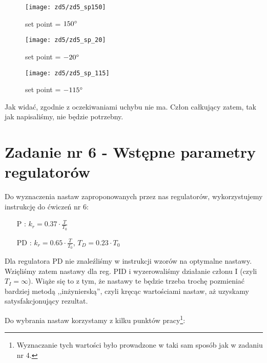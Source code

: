 \documentclass[11 pt]{article}
\begin{document}
\begin{figure}[h!]
	\centerline{
	\texttt{[image: zd5/zd5\_sp150]}
	}
	\caption{set point = $150 \degree$}
\end{figure}

\newpage

\begin{figure}[h!]
	\centerline{
	\texttt{[image: zd5/zd5\_sp\_20]}
	}
	\caption{set point = $-20 \degree$}
\end{figure}

\begin{figure}[h!]
	\centerline{
	\texttt{[image: zd5/zd5\_sp\_115]}
	}
	\caption{set point = $-115 \degree$}
\end{figure}

Jak widać, zgodnie z oczekiwaniami uchybu nie ma. Człon całkujący zatem, tak jak napisaliśmy, nie będzie potrzebny.

\newpage

\setcounter{section}{6}
\setcounter{figure}{0}
\section*{Zadanie nr 6 - Wstępne parametry regulatorów}

Do wyznaczenia nastaw zaproponowanych przez nas regulatorów, wykorzystujemy instrukcję do ćwiczeń nr 6:

\begin{itemize}
\item[P]: $k_r = 0.37 \cdot \frac{T}{T_0}$
\item[PD]: $k_r = 0.65 \cdot \frac{T}{T_0}$, $T_D = 0.23 \cdot T_0$
\end{itemize}

Dla regulatora PD nie znaleźliśmy w instrukcji wzorów na optymalne nastawy. Wzięliśmy zatem nastawy dla reg. PID i wyzerowaliśmy działanie członu I (czyli $T_I = \infty$). Wiąże się to z tym, że nastawy te będzie trzeba trochę pozmieniać bardziej metodą ,,inżynierską'', czyli kręcąc wartościami nastaw, aż uzyskamy satysfakcjonujący rezultat.

Do wybrania nastaw korzystamy z kilku punktów pracy\footnote{Wyznaczanie tych wartości było prowadzone w taki sam sposób jak w zadaniu nr 4.}:
\end{document}
